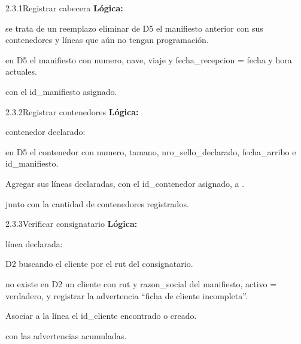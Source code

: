 \begin{minispec}{2.3.1}{Registrar cabecera}
\textbf{Lógica:}
\begin{logica}
    \item {} se trata de un reemplazo  eliminar de D5 el manifiesto anterior
    con sus contenedores y líneas que aún no tengan programación.
    \item {} en D5 el manifiesto con numero, nave, viaje y fecha\_recepcion = fecha
    y hora actuales.
    \item {}  con el id\_manifiesto asignado.
\end{logica}
\end{minispec}

\begin{minispec}{2.3.2}{Registrar contenedores}
\textbf{Lógica:}
\begin{logica}
    \item {} contenedor declarado:
    \begin{logica}
        \item {} en D5 el contenedor con numero, tamano, nro\_sello\_declarado,
        fecha\_arribo e id\_manifiesto.
        \item Agregar sus líneas declaradas, con el id\_contenedor asignado, a
        .
    \end{logica}
    \item {}  junto con la cantidad de contenedores registrados.
\end{logica}
\end{minispec}

\begin{minispec}{2.3.3}{Verificar consignatario}
\textbf{Lógica:}
\begin{logica}
    \item {} línea declarada:
    \begin{logica}
        \item {} D2 buscando el cliente por el rut del consignatario.
        \item {} no existe  en D2 un cliente con rut y
        razon\_social del manifiesto, activo = verdadero, y registrar la advertencia ``ficha
        de cliente incompleta''.
        \item Asociar a la línea el id\_cliente encontrado o creado.
    \end{logica}
    \item {}  con las advertencias acumuladas.
\end{logica}
\end{minispec}

